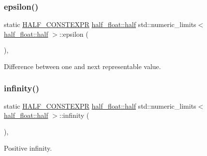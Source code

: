 \subsubsection{\texorpdfstring{epsilon()}{epsilon()}}
{\footnotesize\ttfamily static \hyperlink{half_8hpp_ace3116a3e2cd66dd15780b92060987c7}{H\+A\+L\+F\+\_\+\+C\+O\+N\+S\+T\+E\+X\+PR} \hyperlink{classhalf__float_1_1half}{half\+\_\+float\+::half} std\+::numeric\+\_\+limits$<$ \hyperlink{classhalf__float_1_1half}{half\+\_\+float\+::half} $>$\+::epsilon (\begin{DoxyParamCaption}{ }\end{DoxyParamCaption})\hspace{0.3cm}{\ttfamily [inline]}, {\ttfamily [static]}}



Difference between one and next representable value. 

\mbox{\label{classstd_1_1numeric__limits_3_01half__float_1_1half_01_4_aafcca31b982e48b928c1e6cc318f6e6f}} 
\subsubsection{\texorpdfstring{infinity()}{infinity()}}
{\footnotesize\ttfamily static \hyperlink{half_8hpp_ace3116a3e2cd66dd15780b92060987c7}{H\+A\+L\+F\+\_\+\+C\+O\+N\+S\+T\+E\+X\+PR} \hyperlink{classhalf__float_1_1half}{half\+\_\+float\+::half} std\+::numeric\+\_\+limits$<$ \hyperlink{classhalf__float_1_1half}{half\+\_\+float\+::half} $>$\+::infinity (\begin{DoxyParamCaption}{ }\end{DoxyParamCaption})\hspace{0.3cm}{\ttfamily [inline]}, {\ttfamily [static]}}



Positive infinity. 

\mbox{\label{classstd_1_1numeric__limits_3_01half__float_1_1half_01_4_abe8e9622711ffafb029c35b349d18af4}} 
